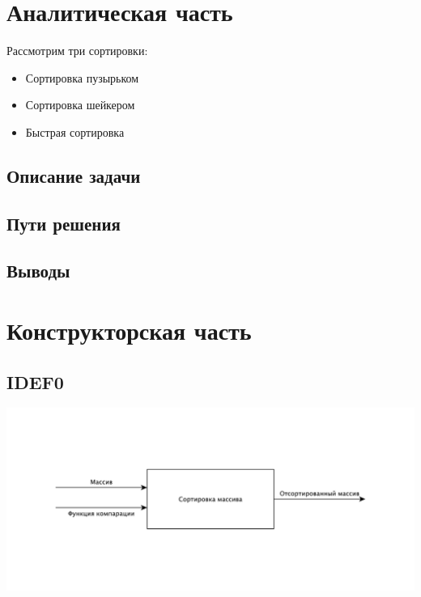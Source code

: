 \documentclass[a4paper,12pt]{article}
\begin{document}
\newpage
\section{Аналитическая часть}

Рассмотрим три сортировки:

\begin{itemize}
    \item Сортировка пузырьком
    \item Сортировка шейкером
    \item Быстрая сортировка
\end{itemize}

\subsection{Описание задачи}



\subsection{Пути решения}



\subsection{Выводы}

\newpage
\section{Конструкторская часть}

\subsection{IDEF0}

\begin{center}
    \includegraphics[scale=0.5]{IDEF0}
\end{center}
\end{document}

